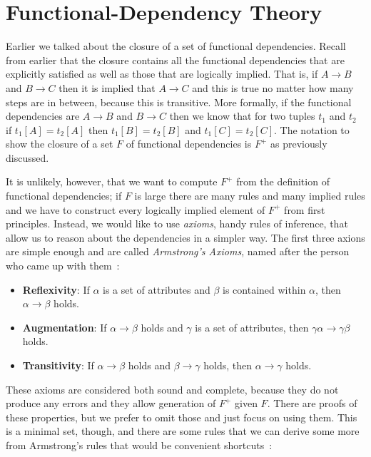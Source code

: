 \documentclass[a4paper]{report}
\begin{document}

\section*{Functional-Dependency Theory}

Earlier we talked about the closure of a set of functional dependencies. Recall from earlier that the closure contains all the functional dependencies that are explicitly satisfied as well as those that are logically implied. That is, if $A \rightarrow B$ and $B \rightarrow C$ then it is implied that $A \rightarrow C$ and this is true no matter how many steps are in between, because this is transitive. More formally, if the functional dependencies are $A \rightarrow B$ and $B \rightarrow C$ then we know that for two tuples $t_{1}$ and $t_{2}$ if $t_{1}[A] = t_{2}[A]$ then $t_{1}[B] = t_{2}[B]$ and $t_{1}[C] = t_{2}[C]$. The notation to show the closure of a set $F$ of functional dependencies is $F^{+}$ as previously discussed.

It is unlikely, however, that we want to compute $F^{+}$ from the definition of functional dependencies; if $F$ is large there are many rules and many implied rules and we have to construct every logically implied element of $F^{+}$ from first principles. Instead, we would like to use \textit{axioms}, handy rules of inference, that allow us to reason about the dependencies in a simpler way. The first three axions are simple enough and are called \textit{Armstrong's Axioms}, named after the person who came up with them~\cite{dsc}:

\begin{itemize}
	\item \textbf{Reflexivity}: If $\alpha$ is a set of attributes and $\beta$ is contained within $\alpha$, then $\alpha \rightarrow \beta$ holds.
	\item \textbf{Augmentation}: If $\alpha \rightarrow \beta$ holds and $\gamma$ is a set of attributes, then $\gamma\alpha \rightarrow \gamma\beta$ holds.
	\item \textbf{Transitivity}: If $\alpha \rightarrow \beta$ holds and $\beta \rightarrow \gamma$ holds, then $\alpha \rightarrow \gamma$ holds.
\end{itemize}

These axioms are considered both sound and complete, because they do not produce any errors and they allow generation of $F^{+}$ given $F$. There are proofs of these properties, but we prefer to omit those and just focus on using them. This is a minimal set, though, and there are some rules that we can derive some more from Armstrong's rules that would be convenient shortcuts~\cite{dsc}:
\end{document}
